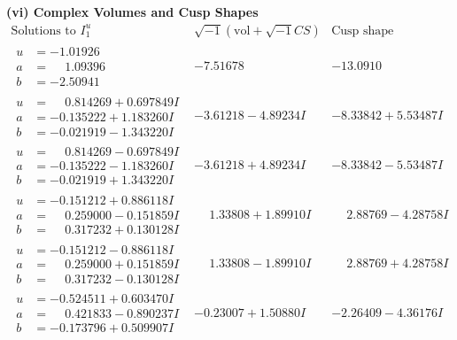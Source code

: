 \documentclass[1p]{elsarticle_modified}
\theoremstyle{definition}
\newcommand{\I}{\sqrt{-1}}
\begin{document}
\newpage\flushleft \textbf{(vi) Complex Volumes and Cusp Shapes}
$$\begin{array}{c|c|c}  
\text{Solutions to }I^u_{1}& \I (\text{vol} + \sqrt{-1}CS) & \text{Cusp shape}\\
 \hline 
\begin{aligned}
u &= -1.01926\phantom{ +0.000000I} \\
a &= \phantom{-}1.09396\phantom{ +0.000000I} \\
b &= -2.50941\phantom{ +0.000000I}\end{aligned}
 & -7.51678\phantom{ +0.000000I} & -13.0910\phantom{ +0.000000I} \\ \hline\begin{aligned}
u &= \phantom{-}0.814269 + 0.697849 I \\
a &= -0.135222 + 1.183260 I \\
b &= -0.021919 - 1.343220 I\end{aligned}
 & -3.61218 - 4.89234 I & -8.33842 + 5.53487 I \\ \hline\begin{aligned}
u &= \phantom{-}0.814269 - 0.697849 I \\
a &= -0.135222 - 1.183260 I \\
b &= -0.021919 + 1.343220 I\end{aligned}
 & -3.61218 + 4.89234 I & -8.33842 - 5.53487 I \\ \hline\begin{aligned}
u &= -0.151212 + 0.886118 I \\
a &= \phantom{-}0.259000 - 0.151859 I \\
b &= \phantom{-}0.317232 + 0.130128 I\end{aligned}
 & \phantom{-}1.33808 + 1.89910 I & \phantom{-}2.88769 - 4.28758 I \\ \hline\begin{aligned}
u &= -0.151212 - 0.886118 I \\
a &= \phantom{-}0.259000 + 0.151859 I \\
b &= \phantom{-}0.317232 - 0.130128 I\end{aligned}
 & \phantom{-}1.33808 - 1.89910 I & \phantom{-}2.88769 + 4.28758 I \\ \hline\begin{aligned}
u &= -0.524511 + 0.603470 I \\
a &= \phantom{-}0.421833 - 0.890237 I \\
b &= -0.173796 + 0.509907 I\end{aligned}
 & -0.23007 + 1.50880 I & -2.26409 - 4.36176 I \\ \hline\begin{aligned}

\end{aligned}
\end{array}$$
\end{document}
